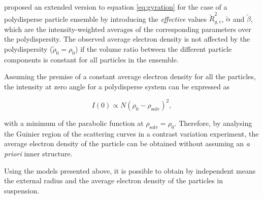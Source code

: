 \cite{avdeev_contrast_2007} proposed an extended version to equation \eqref{eq:gyration} for the case of a polydisperse particle ensemble by introducing the \emph{effective} values \( \tilde R^2_{g,c} \), \( \tilde \alpha \) and \( \tilde \beta \), which are the intensity-weighted averages of the corresponding parameters over the polydispersity. The observed average electron density is not affected by the polydispersity (\( \tilde\rho_0=\rho_0 \)) if the volume ratio between the different particle components is constant for all particles in the ensemble.

Assuming the premise of a constant average electron density for all the particles, the intensity at zero angle for a polydisperse system can be expressed as

\begin{equation}
\label{eq:I0}
I(0)\propto N \left( \rho_0-\rho_{\text{solv}} \right)^2 ,
\end{equation}

with a minimum of the parabolic function at \( \rho_{\text{solv}}=\rho_0 \). Therefore, by analysing the Guinier region of the scattering curves in a contrast variation experiment, the average electron density of the particle can be obtained without assuming an \emph{a priori} inner structure.

Using the models presented above, it is possible to obtain by independent means the external radius and the average electron density of the particles in suspension.
